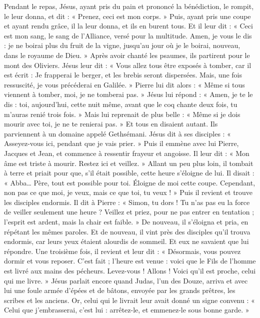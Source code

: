 Pendant le repas, Jésus, ayant pris du pain et prononcé la bénédiction, le rompit, le leur donna, et dit : « Prenez, ceci est mon corps. »
Puis, ayant pris une coupe et ayant rendu grâce, il la leur donna, et ils en burent tous.
Et il leur dit : « Ceci est mon sang, le sang de l’Alliance, versé pour la multitude.
Amen, je vous le dis : je ne boirai plus du fruit de la vigne, jusqu’au jour où je le boirai, nouveau, dans le royaume de Dieu. »
Après avoir chanté les psaumes, ils partirent pour le mont des Oliviers.
Jésus leur dit : « Vous allez tous être exposés à tomber, car il est écrit : Je frapperai le berger, et les brebis seront dispersées.
Mais, une fois ressuscité, je vous précéderai en Galilée. »
Pierre lui dit alors : « Même si tous viennent à tomber, moi, je ne tomberai pas. »
Jésus lui répond : « Amen, je te le dis : toi, aujourd’hui, cette nuit même, avant que le coq chante deux fois, tu m’auras renié trois fois. »
Mais lui reprenait de plus belle : « Même si je dois mourir avec toi, je ne te renierai pas. » Et tous en disaient autant.
Ils parviennent à un domaine appelé Gethsémani. Jésus dit à ses disciples : « Asseyez-vous ici, pendant que je vais prier. »
Puis il emmène avec lui Pierre, Jacques et Jean, et commence à ressentir frayeur et angoisse.
Il leur dit : « Mon âme est triste à mourir. Restez ici et veillez. »
Allant un peu plus loin, il tombait à terre et priait pour que, s’il était possible, cette heure s’éloigne de lui.
Il disait : « Abba… Père, tout est possible pour toi. Éloigne de moi cette coupe. Cependant, non pas ce que moi, je veux, mais ce que toi, tu veux ! »
Puis il revient et trouve les disciples endormis. Il dit à Pierre : « Simon, tu dors ! Tu n’as pas eu la force de veiller seulement une heure ?
Veillez et priez, pour ne pas entrer en tentation ; l’esprit est ardent, mais la chair est faible. »
De nouveau, il s’éloigna et pria, en répétant les mêmes paroles.
Et de nouveau, il vint près des disciples qu’il trouva endormis, car leurs yeux étaient alourdis de sommeil. Et eux ne savaient que lui répondre.
Une troisième fois, il revient et leur dit : « Désormais, vous pouvez dormir et vous reposer. C’est fait ; l’heure est venue : voici que le Fils de l’homme est livré aux mains des pécheurs.
Levez-vous ! Allons ! Voici qu’il est proche, celui qui me livre. »
Jésus parlait encore quand Judas, l’un des Douze, arriva et avec lui une foule armée d’épées et de bâtons, envoyée par les grands prêtres, les scribes et les anciens.
Or, celui qui le livrait leur avait donné un signe convenu : « Celui que j’embrasserai, c’est lui : arrêtez-le, et emmenez-le sous bonne garde. »
